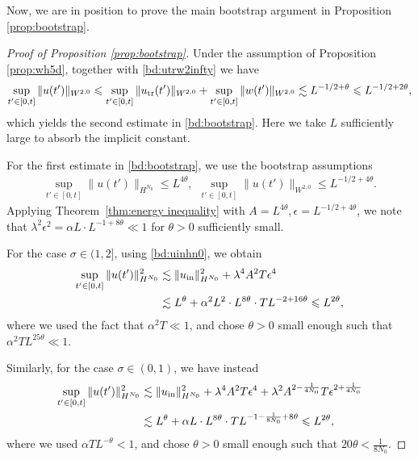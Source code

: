 \documentclass[UTF-8,reqno]{amsart}
\numberwithin{equation}{section}
\theoremstyle{definition}
\def\leq{\leqslant}
\def\leq{\leqslant}
\begin{document}
Now, we are in position to prove the main bootstrap argument in Proposition \ref{prop:bootstrap}.
\begin{proof}[Proof of Proposition \ref{prop:bootstrap}]
 Under the assumption of  Proposition \ref{prop:wh5d}, together with  \eqref{bd:utrw2infty} we have
 \begin{align}
   \sup_{t'\in[0,t]} \|u(t')\|_{W^{2,0}}\leq  \sup_{t'\in[0,t]} \|u_{\rm tr}(t')\|_{W^{2,0}}+ \sup_{t'\in[0,t]} \|w(t')\|_{W^{2,0}}\lesssim L^{-1/2+\theta}\leq  L^{-1/2+2\theta},\notag
\end{align}
which yields the second estimate in \eqref{bd:bootstrap}. Here we take $L$ sufficiently large to absorb the implicit constant.
 

For the first estimate in \eqref{bd:bootstrap}, we use the bootstrap assumptions
\begin{align*}
   \sup_{t'\in[0,t]} \|u(t')\|_{H^{N_0}}\leq L^{4\theta},\ \ \sup_{t'\in[0,t]} \|u(t')\|_{W^{2,0}}\leq L^{-1/2+4\theta}.
\end{align*}
Applying Theorem~\ref{thm:energy inequality} with 
$A=L^{4\theta},\epsilon=L^{-1/2+4\theta}$, we note that $\lambda^2\epsilon^2=\alpha L\cdot L^{-1+8\theta}\ll 1$ for $\theta>0$ sufficiently small.

For the case $\sigma\in(1,2]$, using   \eqref{bd:uinhn0}, we obtain
\begin{align}
\sup_{t'\in[0,t]}  \|u(t')\|_{H^{N_0}}^2&\lesssim  \|u_{\rm in}\|_{H^{N_0}}^2+\lambda^4A^2T\epsilon^4\notag\\
&\lesssim L^{\theta}+\alpha^2 L^{2}\cdot L^{8\theta}\cdot TL^{-2+16\theta}\leq L^{2\theta},\notag
\end{align}
where we used the fact that $\alpha^2T\ll1$, and chose $\theta>0$ small enough such that $\alpha^2TL^{25\theta}\ll1$.

Similarly, for the case $\sigma\in(0,1)$,  we have instead \begin{align}
\sup_{t'\in[0,t]}  \|u(t')\|_{H^{N_0}}^2&\lesssim  \|u_{\rm in}\|_{H^{N_0}}^2+\lambda^4A^2T\epsilon^4+\lambda^2A^{2-\frac{1}{4N_0}}T\epsilon^{2+\frac{1}{4N_0}}\notag\\ 
&\lesssim L^{\theta}+\alpha L\cdot L^{8\theta}\cdot TL^{-1-\frac{1}{8N_0}+8\theta}\leq L^{2\theta},\notag
\end{align}
where  we used $\alpha TL^{-\theta}<1$, and chose $\theta>0$ small enough such that $20\theta<\frac{1}{8N_0}$.

\end{proof}
\end{document}
